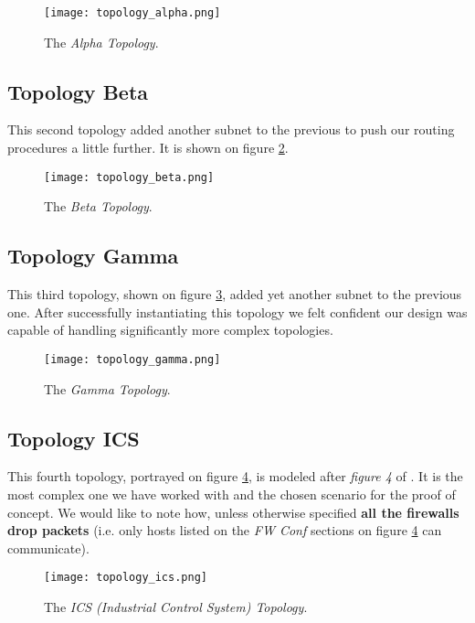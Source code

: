             \begin{figure}
                \centering
                \texttt{[image: topology\_alpha.png]}
                \caption{The \textit{Alpha Topology}.}
                \label{fig:top-alpha}
            \end{figure}

        \subsection{Topology Beta}
            This second topology added another subnet to the previous to push our routing procedures a little further. It is shown on figure \ref{fig:top-beta}.\\

            \begin{figure}
                \centering
                \texttt{[image: topology\_beta.png]}
                \caption{The \textit{Beta Topology}.}
                \label{fig:top-beta}
            \end{figure}

        \subsection{Topology Gamma}
            This third topology, shown on figure \ref{fig:top-gamma}, added yet another subnet to the previous one. After successfully instantiating this topology we felt confident our design was capable of handling significantly more complex topologies.\\

            \begin{figure}
                \centering
                \texttt{[image: topology\_gamma.png]}
                \caption{The \textit{Gamma Topology}.}
                \label{fig:top-gamma}
            \end{figure}

        \subsection{Topology ICS}
            This fourth topology, portrayed on figure \ref{fig:top-ics}, is modeled after \textit{figure 4} of \cite{bib:ics-article}. It is the most complex one we have worked with and the chosen scenario for the proof of concept. We would like to note how, unless otherwise specified \textbf{all the firewalls drop packets} (i.e. only hosts listed on the \textit{FW Conf} sections on figure \ref{fig:top-ics} can communicate).\\

            \begin{figure}
                \centering
                \texttt{[image: topology\_ics.png]}
                \caption{The \textit{ICS (Industrial Control System) Topology}.}
                \label{fig:top-ics}
            \end{figure}
